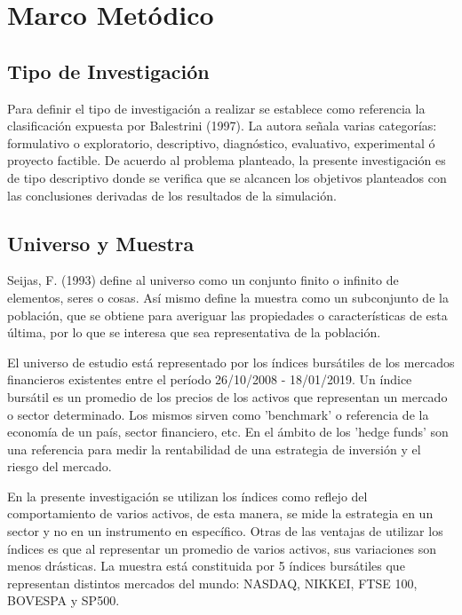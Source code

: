 \documentclass[a4paper,12pt]{Latex/Classes/PhDthesisPSnPDF}
\begin{document}
\chapter{Marco Metódico}


\section{Tipo de Investigación}

Para definir el tipo de investigación a realizar se establece como referencia la clasificación expuesta por Balestrini (1997). La autora señala varias categorías: formulativo o exploratorio, descriptivo, diagnóstico, evaluativo, experimental ó proyecto factible. De acuerdo al problema planteado, la presente investigación es de tipo descriptivo donde se verifica que se alcancen los objetivos planteados con las conclusiones derivadas de los resultados de la simulación.

\section{Universo y Muestra}

Seijas, F. (1993) define al universo como un conjunto finito o infinito de elementos, seres o cosas. Así mismo define la muestra como un subconjunto de la población, que se obtiene para averiguar las propiedades o características de esta última, por lo que se interesa que sea representativa de la población.

El universo de estudio está representado por los índices bursátiles de los mercados financieros existentes entre el período 26/10/2008 - 18/01/2019. Un índice bursátil es un promedio de los precios de los activos que representan un mercado o sector determinado. Los mismos sirven como 'benchmark' o referencia de la economía de un país, sector financiero, etc. En el ámbito de los 'hedge funds' son una referencia para medir la rentabilidad de una estrategia de inversión y el riesgo del mercado.

En la presente investigación se utilizan los índices como reflejo del comportamiento de varios activos, de esta manera, se mide la estrategia en un sector y no en un instrumento en específico. Otras de las ventajas de utilizar los índices es que al representar un promedio de varios activos, sus variaciones son menos drásticas. La muestra está constituida por 5 índices bursátiles que representan distintos mercados del mundo: NASDAQ, NIKKEI, FTSE 100, BOVESPA y SP500.
\end{document}
